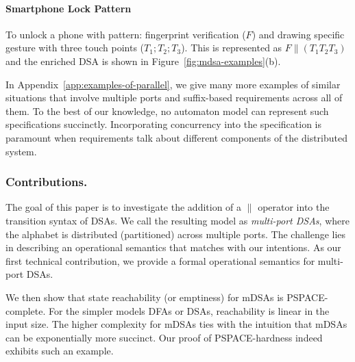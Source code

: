    \paragraph*{Smartphone Lock Pattern} To unlock a phone with pattern: fingerprint verification ($F$) and drawing specific gesture with three touch points ($T_1;T_2;T_3$). This is represented as $F \parallel (T_1 T_2 T_3)$ and the enriched DSA is shown in Figure~\ref{fig:mdsa-examples}(b).
   
  In Appendix~\ref{app:examples-of-parallel}, we give many more examples of similar situations that involve multiple ports and suffix-based requirements across all of them. To the best of our knowledge, no automaton model can represent such specifications succinctly. Incorporating concurrency into the specification is paramount when requirements talk about different components of the distributed system. 
  
  \subsubsection*{Contributions.} The goal of this paper is to investigate the addition of a $\parallel$ operator into the transition syntax of DSAs. We call the resulting model as \emph{multi-port DSAs}, where the alphabet is distributed (partitioned) across multiple ports. The challenge lies in describing an operational semantics that matches with our intentions. As our first technical contribution, we provide a formal operational semantics for multi-port DSAs. 
  
  We then show that state reachability (or emptiness) for mDSAs is PSPACE-complete. For the simpler models DFAs or DSAs, reachability is linear in the input size. The higher complexity for mDSAs ties with the intuition that mDSAs can be exponentially more succinct. Our proof of PSPACE-hardness indeed exhibits such an example. 

